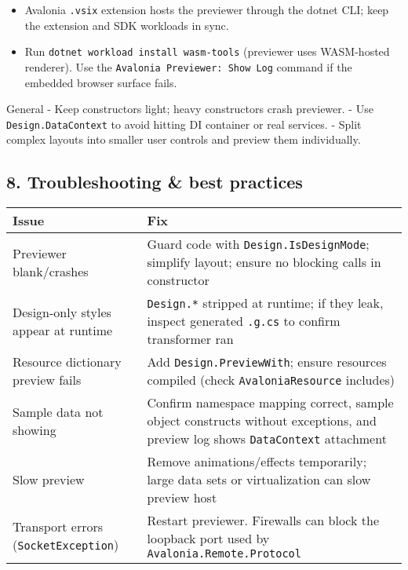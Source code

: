 \begin{itemize}
\tightlist
\item
  Avalonia \passthrough{\lstinline!.vsix!} extension hosts the previewer
  through the dotnet CLI; keep the extension and SDK workloads in sync.
\item
  Run \passthrough{\lstinline!dotnet workload install wasm-tools!}
  (previewer uses WASM-hosted renderer). Use the
  \passthrough{\lstinline!Avalonia Previewer: Show Log!} command if the
  embedded browser surface fails.
\end{itemize}

General - Keep constructors light; heavy constructors crash previewer. -
Use \passthrough{\lstinline!Design.DataContext!} to avoid hitting DI
container or real services. - Split complex layouts into smaller user
controls and preview them individually.

\subsection{8. Troubleshooting \& best
practices}\label{troubleshooting-best-practices-1}

\begin{longtable}[]{@{}
  >{\raggedright\arraybackslash}p{}
  >{\raggedright\arraybackslash}p{}@{}}
\toprule\noalign{}
\begin{minipage}[b]{\linewidth}\raggedright
Issue
\end{minipage} & \begin{minipage}[b]{\linewidth}\raggedright
Fix
\end{minipage} \\
\midrule\noalign{}
\endhead
\bottomrule\noalign{}
\endlastfoot
Previewer blank/crashes & Guard code with
\passthrough{\lstinline!Design.IsDesignMode!}; simplify layout; ensure
no blocking calls in constructor \\
Design-only styles appear at runtime &
\passthrough{\lstinline!Design.*!} stripped at runtime; if they leak,
inspect generated \passthrough{\lstinline!.g.cs!} to confirm transformer
ran \\
Resource dictionary preview fails & Add
\passthrough{\lstinline!Design.PreviewWith!}; ensure resources compiled
(check \passthrough{\lstinline!AvaloniaResource!} includes) \\
Sample data not showing & Confirm namespace mapping correct, sample
object constructs without exceptions, and preview log shows
\passthrough{\lstinline!DataContext!} attachment \\
Slow preview & Remove animations/effects temporarily; large data sets or
virtualization can slow preview host \\
Transport errors (\passthrough{\lstinline!SocketException!}) & Restart
previewer. Firewalls can block the loopback port used by
\passthrough{\lstinline!Avalonia.Remote.Protocol!} \\
\end{longtable}

